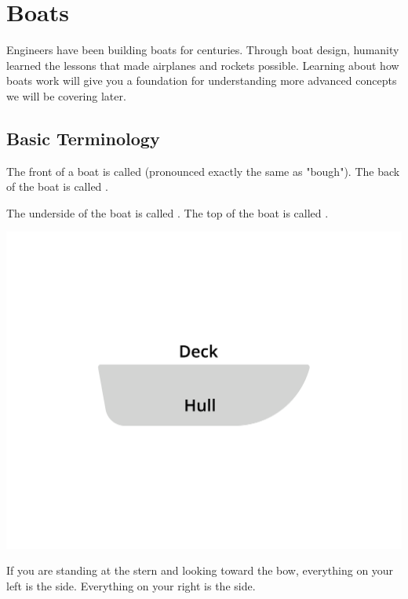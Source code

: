 \chapter{Boats}

Engineers have been building boats for centuries.  Through boat design, humanity learned the lessons that made airplanes and rockets possible.  
Learning about how boats work will give you a foundation for understanding more advanced concepts we will be covering later.

\section{Basic Terminology}
The front of a boat is called  (pronounced exactly the same as "bough"). The back of the boat is called .

The underside of the boat is called .  The top of the boat is called .

\begin{center}
    \includegraphics[width=.75\textwidth]{deckHull.png}
    
\end{center}

If you are standing at the stern and looking toward the bow, everything on your left is the  side.  Everything on your right is the  side.

